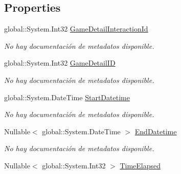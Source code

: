 \subsection*{Properties}
\begin{DoxyCompactItemize}
\item 
global\-::\-System.\-Int32 \hyperlink{class_microsoft_1_1_samples_1_1_kinect_1_1_basic_interactions_1_1_game_detail_interactions_a019b7118044d47322c0107bfdc953080}{Game\-Detail\-Interaction\-Id}
\begin{DoxyCompactList}\small\item\em No hay documentación de metadatos disponible. \end{DoxyCompactList}\item 
global\-::\-System.\-Int32 \hyperlink{class_microsoft_1_1_samples_1_1_kinect_1_1_basic_interactions_1_1_game_detail_interactions_af13cbe5cd59097bdfe99a26b819e3fd8}{Game\-Detail\-I\-D}
\begin{DoxyCompactList}\small\item\em No hay documentación de metadatos disponible. \end{DoxyCompactList}\item 
global\-::\-System.\-Date\-Time \hyperlink{class_microsoft_1_1_samples_1_1_kinect_1_1_basic_interactions_1_1_game_detail_interactions_ae64a0c1195f6788b658f10b37f3453a5}{Start\-Datetime}
\begin{DoxyCompactList}\small\item\em No hay documentación de metadatos disponible. \end{DoxyCompactList}\item 
Nullable$<$ global\-::\-System.\-Date\-Time $>$ \hyperlink{class_microsoft_1_1_samples_1_1_kinect_1_1_basic_interactions_1_1_game_detail_interactions_a7a8e7a7404bd31c2bad373ff748e6276}{End\-Datetime}
\begin{DoxyCompactList}\small\item\em No hay documentación de metadatos disponible. \end{DoxyCompactList}\item 
Nullable$<$ global\-::\-System.\-Int32 $>$ \hyperlink{class_microsoft_1_1_samples_1_1_kinect_1_1_basic_interactions_1_1_game_detail_interactions_ae4760b77d43df6fc4b45615efbcc9425}{Time\-Elapsed}

\end{DoxyCompactItemize}
